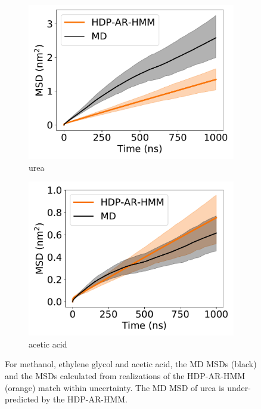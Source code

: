 \documentclass[journal=jpcbfk,manuscript=article]{achemso}
\begin{document}
\begin{figure}
\begin{subfigure}{0.24\textwidth}
  \includegraphics[width=\textwidth]{unclustered_msd_URE.pdf}
  \caption{urea}\label{fig:unclustered_msd_URE}
  \end{subfigure}
  \begin{subfigure}{0.24\textwidth}
  \includegraphics[width=\textwidth]{unclustered_msd_ACH.pdf}
  \caption{acetic acid}\label{fig:unclustered_msd_ACH}
  \end{subfigure}
  \caption{For methanol, ethylene glycol and acetic acid, the MD MSDs (black) and
  the MSDs calculated from realizations of the HDP-AR-HMM (orange) match within 
  uncertainty. The MD MSD of urea is under-predicted by the HDP-AR-HMM.
  }\label{fig:unclustered_msds}
  \end{figure}
  
\end{document}

